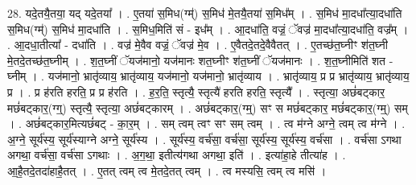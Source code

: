 \documentclass[17pt]{extarticle}
\begin{document}
28. यदे॒तयै॒तया॒ यद् यदे॒तया᳚ । . ए॒तया॑ स॒मिध(ग्म्॑) स॒मिध॑ मे॒तयै॒तया॑ स॒मिध᳚म् । . स॒मिध॑ मा॒दधा᳚त्या॒दधा॑ति स॒मिध(ग्म्॑) स॒मिध॑ मा॒दधा॑ति । . स॒मिध॒मिति॑ सं - इध᳚म् । . आ॒दधा॑ति॒ वज्रं॒ ॅवज्र॑ मा॒दधा᳚त्या॒दधा॑ति॒ वज्र᳚म् । . आ॒दधा॒तीत्या᳚ - दधा॑ति । . वज्र॑ मे॒वैव वज्रं॒ ॅवज्र॑ मे॒व । . ए॒वैतदे॒तदे॒वैवैतत् । . ए॒तच्छ॑त॒घ्नीꣳ श॑त॒घ्नी मे॒तदे॒तच्छ॑त॒घ्नीम् । . श॒त॒घ्नीं ॅयज॑मानो॒ यज॑मानः शत॒घ्नीꣳ श॑त॒घ्नीं ॅयज॑मानः । . श॒त॒घ्नीमिति॑ शत - घ्नीम् । . यज॑मानो॒ भ्रातृ॑व्याय॒ भ्रातृ॑व्याय॒ यज॑मानो॒ यज॑मानो॒ भ्रातृ॑व्याय । . भ्रातृ॑व्याय॒ प्र प्र भ्रातृ॑व्याय॒ भ्रातृ॑व्याय॒ प्र । . प्र ह॑रति हरति॒ प्र प्र ह॑रति । . ह॒र॒ति॒ स्तृत्यै॒ स्तृत्यै॑ हरति हरति॒ स्तृत्यै᳚ । . स्तृत्या॒ अछं॑बट्कार॒ मछं॑बट्कार॒(ग्ग्॒) स्तृत्यै॒ स्तृत्या॒ अछं॑बट्कारम् । . अछं॑बट्कार॒(ग्म्॒) सꣳ स मछं॑बट्कार॒ मछं॑बट्कार॒(ग्म्॒) सम् । . अछं॑बट्कार॒मित्यछं॑बट् - का॒र॒म् । . सम् त्वम् त्वꣳ सꣳ सम् त्वम् । . त्व म॑ग्ने अग्ने॒ त्वम् त्व म॑ग्ने । . अ॒ग्ने॒ सूर्य॑स्य॒ सूर्य॑स्याग्ने अग्ने॒ सूर्य॑स्य । . सूर्य॑स्य॒ वर्च॑सा॒ वर्च॑सा॒ सूर्य॑स्य॒ सूर्य॑स्य॒ वर्च॑सा । . वर्च॑सा ऽगथा अगथा॒ वर्च॑सा॒ वर्च॑सा ऽगथाः । . अ॒ग॒था॒ इतीत्य॑गथा अगथा॒ इति॑ । . इत्या॑हा॒हे तीत्या॑ह । . आ॒है॒तदे॒तदा॑हाहै॒तत् । . ए॒तत् त्वम् त्व मे॒तदे॒तत् त्वम् । . त्व मस्यसि॒ त्वम् त्व मसि॑ । \newline
\end{document}
